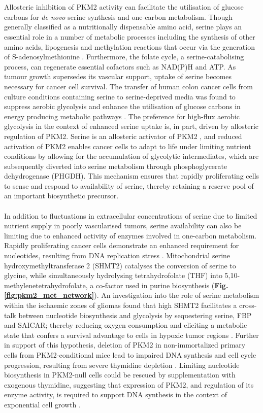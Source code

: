 %
%
\\\\
%
%
Allosteric inhibition of PKM2 activity can facilitate the utilisation of glucose carbons for \textit{de novo} serine synthesis and one-carbon metabolism. Though generally classified as a nutritionally dispensable amino acid, serine plays an essential role in a number of metabolic processes including the synthesis of other amino acids, lipogenesis and methylation reactions that occur via the generation of S-adenosylmethionine \cite{Yang:2016ab}. Furthermore, the folate cycle, a serine-catabolising process, can regenerate essential cofactors such as NAD(P)H and ATP. As tumour growth supersedes its vascular support, uptake of serine becomes necessary for cancer cell survival. The transfer of human colon cancer cells from culture conditions containing serine to serine-deprived media was found to suppress aerobic glycolysis and enhance the utilisation of glucose carbons in energy producing metabolic pathways \cite{Maddocks:2013aa}. The preference for high-flux aerobic glycolysis in the context of enhanced serine uptake is, in part, driven by allosteric regulation of PKM2. Serine is an allosteric activator of PKM2 \cite{Chaneton:2012aa}, and reduced activation of PKM2 enables cancer cells to adapt to life under limiting nutrient conditions by allowing for the accumulation of glycolytic intermediates, which are subsequently diverted into serine metabolism through phosphoglycerate dehydrogenase (PHGDH). This mechanism ensures that rapidly proliferating cells to sense and respond to availability of serine, thereby retaining a reserve pool of an important biosynthetic precursor. 
%
%
\\\\
%
%
In addition to fluctuations in extracellular concentrations of serine due to limited nutrient supply in poorly vascularised tumors, serine availability can also be limiting due to enhanced activity of enzymes involved in one-carbon metabolism. Rapidly proliferating cancer cells demonstrate an enhanced requirement for nucleotides, resulting from DNA replication stress \cite{Bartkova:2005aa}. Mitochondrial serine hydroxymethyltransferase 2 (SHMT2) catalyses the conversion of serine to glycine, while simultaneously hydrolysing tetrahydrofolate (THF) into 5,10-methylenetetrahydrofolate, a co-factor used in purine biosynthesis (\textbf{Fig. \ref{fig:pkm2_met_network}}). An investigation into the role of serine metabolism within the ischaemic zones of gliomas found that high SHMT2 facilitates a cross-talk between nucleotide biosynthesis and glycolysis by sequestering serine, FBP and SAICAR; thereby reducing oxygen consumption and eliciting a metabolic state that confers a survival advantage to cells in hypoxic tumor regions \cite{Kim:2015aa}. Further in support of this hypothesis, deletion of PKM2 in non-immortalized primary cells from PKM2-conditional mice \cite{Israelsen:2013aa} lead to impaired DNA synthesis and cell cycle progression, resulting from severe thymidine depletion \cite{Lunt:2015aa}. Limiting nucleotide biosynthesis in PKM2-null cells could be rescued by supplementation with exogenous thymidine, suggesting that expression of PKM2, and regulation of its enzyme activity, is required to support DNA synthesis in the context of exponential cell growth \cite{Lunt:2015aa}.

